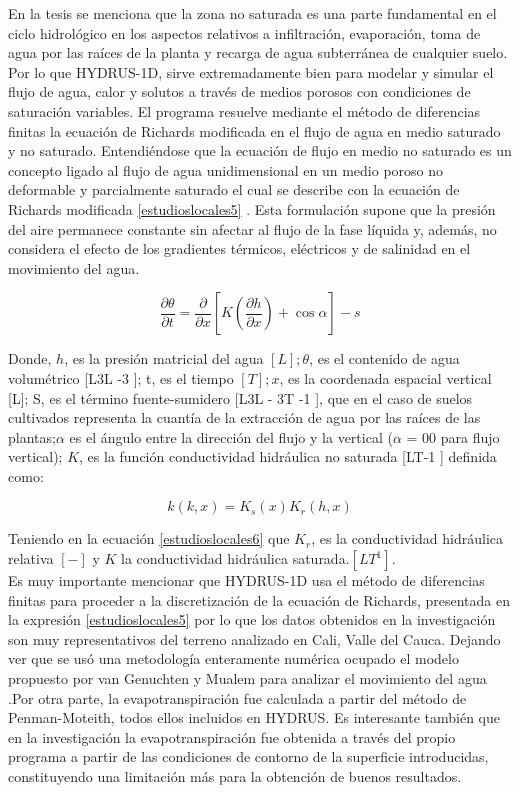 En la tesis se menciona que la zona no saturada es una parte fundamental en el ciclo hidrológico en los aspectos relativos a infiltración, evaporación, toma de agua por las raíces de la planta y recarga de agua subterránea de cualquier suelo. Por lo que HYDRUS-1D, sirve extremadamente bien para modelar y simular  el flujo de agua, calor y solutos a través de medios porosos con condiciones de saturación variables. El programa resuelve mediante el método de diferencias finitas la ecuación de Richards modificada en el flujo de agua en medio saturado y no saturado.  Entendiéndose que la ecuación de flujo en medio no saturado es un  concepto ligado al  flujo de agua unidimensional en un medio poroso no deformable y parcialmente saturado el cual  se describe con la ecuación de Richards modificada \eqref{estudioslocales5} . Esta formulación supone que la presión del aire permanece constante sin afectar al flujo de la fase líquida y, además, no considera el efecto de los gradientes térmicos, eléctricos y de salinidad en el movimiento del agua.

\begin{equation}
	\frac{\partial \theta }{\partial t} =  \frac{\partial }{\partial x}\left [ K\left ( \frac{\partial h}{\partial x} \right )+\cos\alpha  \right ]-s
	\label{estudioslocales5}    
\end{equation}

Donde, $h$, es la presión matricial del agua $[L]; \theta$, es el contenido de agua volumétrico [L3L -3 ]; t, es el tiempo $[T]; x$, es la coordenada espacial vertical [L]; S, es el término fuente-sumidero [L3L - 3T -1 ], que en el caso de suelos cultivados representa la cuantía de la extracción de agua por las raíces de las plantas;$\alpha$ es el ángulo entre la dirección del flujo y la vertical ($\alpha $ = 00 para flujo vertical); $K$, es la función conductividad hidráulica no saturada [LT-1 ] definida como:

\begin{equation}
	k(k,x)=K_{s}(x)K_{r}(h,x)
	\label{estudioslocales6}    
\end{equation}

Teniendo en la ecuación \eqref{estudioslocales6} que $K_{r}$, es la conductividad hidráulica relativa $[-]$ y $K$ la conductividad hidráulica saturada.$[LT^{1}]$.\\

Es muy importante mencionar que HYDRUS-1D usa el método de diferencias finitas para proceder a la discretización de la ecuación de Richards, presentada en la expresión \eqref{estudioslocales5} por lo que los datos obtenidos en la investigación son muy representativos del terreno analizado en Cali, Valle del Cauca. Dejando ver que se usó una metodología enteramente numérica ocupado el modelo propuesto por van Genuchten y Mualem  para analizar el movimiento del agua .Por otra parte,  la evapotranspiración fue   calculada a partir del método de Penman-Moteith, todos ellos incluidos en HYDRUS. Es interesante también que en la investigación  la evapotranspiración fue  obtenida a través del propio programa a partir de las condiciones de contorno de la superficie introducidas, constituyendo una limitación más para la obtención de buenos resultados.\\